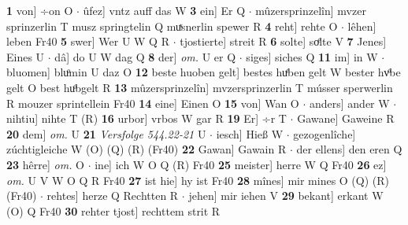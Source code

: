 \documentclass[8pt,a4paper,notitlepage]{article}
\begin{document}
\begin{table}[ht]
\begin{minipage}[t]{0.5\linewidth}
\textbf{1} von] ÷on O  $\cdot$ ûfez] vntz auff das W \textbf{3} ein] Er Q  $\cdot$ mûzersprinzelîn] mvzer sprinzerlin T musz springtelin Q muͯsnerlin spewer R \textbf{4} reht] rehte O  $\cdot$ lêhen] leben Fr40 \textbf{5} swer] Wer U W Q R  $\cdot$ tjostierte] streit R \textbf{6} solte] soͤlte V \textbf{7} Jenes] Eines U  $\cdot$ dâ] do U W dag Q \textbf{8} der] \textit{om.} U er Q  $\cdot$ siges] siches Q \textbf{11} im] in W  $\cdot$ bluomen] bluͦmin U daz O \textbf{12} beste huoben gelt] bestes huͤben gelt W bester hvͦbe gelt O best huͦbgelt R \textbf{13} mûzersprinzelîn] mvzersprinzerlin T músser sperwerlin R mouzer sprintellein Fr40 \textbf{14} eine] Einen O \textbf{15} von] Wan O  $\cdot$ anders] ander W  $\cdot$ nihtiu] nihte T (R) \textbf{16} urbor] vrbos W gar R \textbf{19} Er] ÷r T  $\cdot$ Gawane] Gaweine R \textbf{20} dem] \textit{om.} U \textbf{21} \textit{Versfolge 544.22-21} U   $\cdot$ iesch] Hieß W  $\cdot$ gezogenlîche] zúchtigleiche W (O) (Q) (R) (Fr40) \textbf{22} Gawan] Gawain R  $\cdot$ der ellens] den eren Q \textbf{23} hêrre] \textit{om.} O  $\cdot$ ine] ich W O Q (R) Fr40 \textbf{25} meister] herre W Q Fr40 \textbf{26} ez] \textit{om.} U V W O Q R Fr40 \textbf{27} ist hie] hy ist Fr40 \textbf{28} mînes] mir mines O (Q) (R) (Fr40)  $\cdot$ rehtes] herze Q Rechtten R  $\cdot$ jehen] mir iehen V \textbf{29} bekant] erkant W (O) Q Fr40 \textbf{30} rehter tjost] rechttem strit R \newline
\end{minipage}
\end{table}
\end{document}
